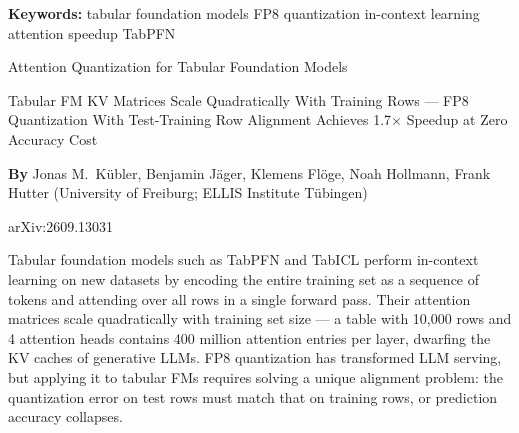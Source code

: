 \documentclass[10pt,twocolumn]{article}
\begin{document}
\setlength{\parindent}{0pt}
\setlength{\parskip}{4pt}

{\small\color{keywordgray}\textbf{Keywords:}
  tabular foundation models \textbullet{}
  FP8 quantization \textbullet{}
  in-context learning \textbullet{}
  attention speedup \textbullet{}
  TabPFN}\par\vspace{4pt}

{\LARGE\bfseries\raggedright
  Attention Quantization for Tabular
  Foundation Models}\par\vspace{4pt}

{\large\itshape\raggedright
  Tabular FM KV Matrices Scale Quadratically With Training Rows ---
  FP8 Quantization With Test-Training Row Alignment Achieves
  1.7$\times$ Speedup at Zero Accuracy Cost}\par\vspace{6pt}

{\small\textbf{By} Jonas M.\ K\"ubler, Benjamin J\"ager, Klemens Fl\"oge,
  Noah Hollmann, Frank Hutter
  (University of Freiburg; ELLIS Institute T\"ubingen)}\par\vspace{2pt}

{\small\color{keywordgray}arXiv:2609.13031}
\par\vspace{2pt}\noindent{\color{rulered}\rule{\columnwidth}{0.6pt}}\vspace{6pt}

Tabular foundation models such as TabPFN and TabICL perform in-context
learning on new datasets by encoding the entire training set as a
sequence of tokens and attending over all rows in a single forward pass.
Their attention matrices scale quadratically with training set size ---
a table with 10,000 rows and 4 attention heads contains 400 million
attention entries per layer, dwarfing the KV caches of generative LLMs.
FP8 quantization has transformed LLM serving, but applying it to tabular
FMs requires solving a unique alignment problem: the quantization error
on test rows must match that on training rows, or prediction accuracy
collapses.
\end{document}
